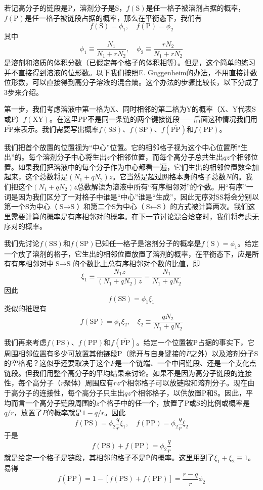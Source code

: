 \documentclass[main.tex]{subfiles}
\begin{document}
若记高分子的链段是P，溶剂分子是S，$f\left(\text{S}\right)$是任一格子被溶剂占据的概率，$f\left(\text{P}\right)$是任一格子被链段占据的概率，那么在平衡态下，我们有
\[f\left(\text{S}\right)=\phi_1,\quad f\left(\text{P}\right)=\phi_2\]
其中
\[\phi_1\equiv\frac{N_1}{N_1+rN_2},\quad\phi_2\equiv\frac{rN_2}{N_1+rN_2}\]
是溶剂和溶质的体积分数（已假定每个格子的体积相等）。但是，这个简单的练习并不直接得到溶液的位形数。以下我们按照E. Guggenheim的办法\cite{Guggenheim1952,Tompa1956}，不用直接计数位形数，可以直接得到高分子溶液的混合熵。这个办法的步骤比较长，以下分成了3步来介绍。

第一步，我们考虑溶液中第一格为X、同时相邻的第二格为Y的概率（X、Y代表S或P）$f\left(\text{XY}\right)$。在这里PP不是同一条链的两个键接链段——后面这种情况我们用$\overline{\text{PP}}$来表示。我们需要写出概率$f\left(\text{SS}\right)$、$f\left(\text{SP}\right)$、$f\left(\overline{\text{PP}}\right)$和$f\left(\text{PP}\right)$。

我们把首个放置的位置视为“中心”位置。它的相邻格子视为这个中心位置所“生出”的。每个溶剂分子中心将生出$z$个相邻位置，而每个高分子总共生出$qz$个相邻位置。如果我们把溶液中的每个分子作为中心都看一遍，它们生出的相邻位置数全加起来，这个总数将是$\left(N_1+qN_2\right)z$。它当然是超过网格本身的格子总数$N$的。我们把这个$\left(N_1+qN_2\right)z$总数解读为溶液中所有“有序相邻对”的个数。用“有序”一词是因为我们区分了一对格子中谁是“中心”谁是“生成”，因此无序对SS将会分别以第一个S为中心（$\text{S}\rightarrow\text{S}$）和第二个S为中心（$\text{S}\leftarrow\text{S}$）的方式被计算两次。我们这里需要计算的概率是有序相邻对的概率。在下一节讨论混合焓变时，我们将考虑无序对的概率。

我们先讨论$f\left(\text{SS}\right)$和$f\left(\text{SP}\right)$已知任一格子是溶剂分子的概率是$f\left(\text{S}\right)=\phi_1$。给定一个放了溶剂的格子，它生出的相邻位置放置了溶剂的概率，在平衡态下，应是所有有序相邻对中$\text{S}\rightarrow\text{S}$的个数比上总有序相邻对个数的比值，即
\[\xi_1\equiv\frac{N_1 z}{\left(N_1+qN_2\right)z}=\frac{N_1}{N_1+qN_2}\]
因此
\[f\left(\text{SS}\right)=\phi_1\xi_1\]
类似的推理有
\[f\left(\text{SP}\right)=\phi_1\xi_2,\quad \xi_2\equiv\frac{qN_2}{N_1+qN_2}\]

我们再来考虑$f\left(\text{PS}\right)$、$f\left(\text{PP}\right)$和$f\left(\overline{\text{PP}}\right)$。给定一个位置被P占据的事实下，它周围相邻位置有多少可放置其他链段P（除开与自身键接的$\overline{P}$之外）以及溶剂分子S的空格呢？这似乎还要取决于这个$P$是一个链端、一个中间链段、还是一个支化点链段。但我们用整个高分子的平均结果来讨论。如果不是因为高分子链段的连接性，每个高分子（$r$聚体）周围应有$rz$个相邻格子可以放链段和溶剂分子。现在由于高分子的连接性，每个高分子只生出$qz$个相邻格子，以供放置P和S。因此，平均而言一个高分子链段周围的$z$个格子中的任一个，放置了P或S的比例或概率是$q/r$，放置了$\overline{P}$的概率就是$1-q/r$。因此
\[f\left(\text{PS}\right)=\phi_2\frac{q}{r}\xi_1,\quad f\left(\text{PP}\right)=\phi_2\frac{q}{r}\xi_2\]
于是
\[f\left(\text{PS}\right)+f\left(\text{PP}\right)=\phi_2\frac{q}{r}\]
就是给定一个格子是链段，其相邻的格子不是$\overline{\text{P}}$的概率。这里用到了$\xi_1+\xi_2\equiv 1$。易得
\[f\left(\overline{\text{PP}}\right)=1-\left[f\left(\text{PS}\right)+f\left(\text{PP}\right)\right]=\frac{r-q}{r}\phi_2\]
\end{document}

